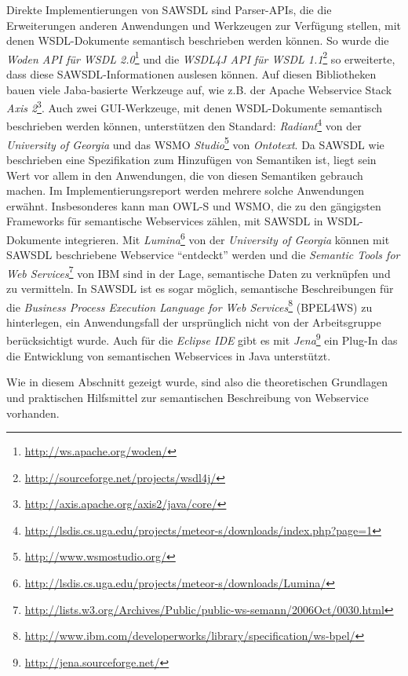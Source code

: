 Direkte Implementierungen von \ac{SAWSDL} sind Parser-\ac{API}s, die die Erweiterungen anderen Anwendungen und Werkzeugen zur Verfügung stellen, mit denen \ac{WSDL}-Dokumente semantisch beschrieben werden können. So wurde die \emph{Woden API für WSDL 2.0}\footnote{\url{http://ws.apache.org/woden/}} und die \emph{WSDL4J API für WSDL
1.1}\footnote{\url{http://sourceforge.net/projects/wsdl4j/}} so erweiterte, dass diese \ac{SAWSDL}-Informationen auslesen können. Auf diesen Bibliotheken bauen viele Jaba-basierte Werkzeuge auf, wie z.B. der Apache Webservice Stack \emph{Axis 2}\footnote{\url{http://axis.apache.org/axis2/java/core/}}. Auch zwei GUI-Werkzeuge, mit denen \ac{WSDL}-Dokumente semantisch beschrieben werden können, unterstützen den Standard: \emph{Radiant}\footnote{\url{http://lsdis.cs.uga.edu/projects/meteor-s/downloads/index.php?page=1}} von der \emph{University of Georgia} und das \acl{WSMO} \emph{Studio}\footnote{\url{http://www.wsmostudio.org/}} von \emph{Ontotext}. Da \ac{SAWSDL} wie beschrieben eine Spezifikation zum Hinzufügen von Semantiken ist, liegt sein Wert vor allem in den Anwendungen, die von diesen Semantiken gebrauch machen. Im Implementierungsreport werden mehrere solche Anwendungen erwähnt.
Insbesonderes kann man \ac{OWL-S} und \ac{WSMO}, die zu den gängigsten Frameworks für semantische Webservices zählen,  mit \ac{SAWSDL} in \ac{WSDL}-Dokumente integrieren. Mit \emph{Lumina}\footnote{\url{http://lsdis.cs.uga.edu/projects/meteor-s/downloads/Lumina/}} von der \emph{University of Georgia} können mit \ac{SAWSDL} beschriebene Webservice "`entdeckt"' werden und die \emph{Semantic Tools for Web Services}\footnote{\url{http://lists.w3.org/Archives/Public/public-ws-semann/2006Oct/0030.html}} von IBM sind in der Lage, semantische Daten zu verknüpfen und zu vermitteln.
In \ac{SAWSDL} ist es sogar möglich, semantische Beschreibungen für die \emph{Business Process Execution Language for Web Services}\footnote{\url{http://www.ibm.com/developerworks/library/specification/ws-bpel/}} (BPEL4WS) zu hinterlegen, ein Anwendungsfall der ursprünglich nicht von der Arbeitsgruppe berücksichtigt wurde. \cite[S.63]{ky-sawsdl} Auch für die \emph{Eclipse IDE} gibt es mit \emph{Jena}\footnote{\url{http://jena.sourceforge.net/}} ein Plug-In das die Entwicklung von semantischen Webservices in Java unterstützt.

\bigskip

Wie in diesem Abschnitt gezeigt wurde, sind also die theoretischen Grundlagen und praktischen Hilfsmittel zur semantischen Beschreibung von Webservice vorhanden.
